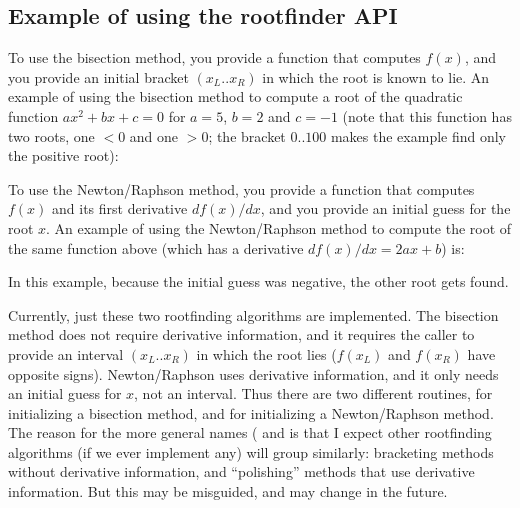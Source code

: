 


\subsection{Example of using the rootfinder API}

To use the bisection method, you provide a function that computes
$f(x)$, and you provide an initial bracket $(x_L..x_R)$ in which the
root is known to lie.  An example of using the bisection method to
compute a root of the quadratic function $ax^2 + bx + c = 0$ for
$a=5$, $b=2$ and $c=-1$ (note that this function has two roots, one
$<0$ and one $>0$; the bracket $0..100$ makes the example find only
the positive root):




To use the Newton/Raphson method, you provide a function that computes
$f(x)$ and its first derivative $df(x)/dx$, and you provide an initial
guess for the root $x$. An example of using the Newton/Raphson method
to compute the root of the same function above (which has a derivative
$df(x)/dx = 2ax + b$) is:



In this example, because the initial guess was negative, the other
root gets found.

Currently, just these two rootfinding algorithms are implemented.  The
bisection method does not require derivative information, and it
requires the caller to provide an interval $(x_L..x_R)$ in which the
root lies ($f(x_L)$ and $f(x_R)$ have opposite signs). Newton/Raphson
uses derivative information, and it only needs an initial guess for
$x$, not an interval. Thus there are two different 
routines,  for initializing
a bisection method, and  for
initializing a Newton/Raphson method. The reason for the more general
names ( and  is that
I expect other rootfinding algorithms (if we ever implement any) will
group similarly: bracketing methods without derivative information,
and ``polishing'' methods that use derivative information. But this
may be misguided, and may change in the future.


